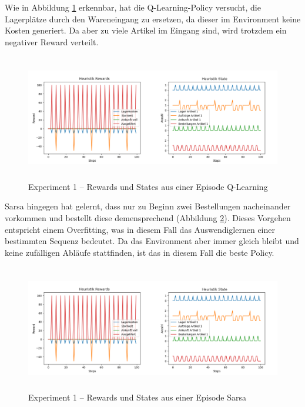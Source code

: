 \newpage
Wie in Abbildung \ref{fig:e1-pol-q} erkennbar, hat die Q-Learning-Policy versucht, die Lagerplätze durch den Wareneingang zu ersetzen, da dieser im Environment keine Kosten generiert. Da aber zu viele Artikel im Eingang sind, wird trotzdem ein negativer Reward verteilt. 

\begin{figure}[H]
  \centering
  \includegraphics[height=5.5cm]{img/plots/exp-1/heu-rew-state.png}
  \caption{Experiment 1 – Rewards und States aus einer Episode Q-Learning}
    \label{fig:e1-pol-q}
\end{figure}
Sarsa hingegen hat gelernt, dass nur zu Beginn zwei Bestellungen nacheinander vorkommen und bestellt diese demensprechend (Abbildung \ref{fig:e1-pol-sarsa}). Dieses Vorgehen entspricht einem Overfitting, was in diesem Fall das Auswendiglernen einer bestimmten Sequenz bedeutet. Da das Environment aber immer gleich bleibt und keine zufälligen Abläufe stattfinden, ist das in diesem Fall die beste Policy.
\begin{figure}[H]
  \centering
  \includegraphics[height=5.5cm]{img/plots/exp-1/heu-rew-state.png}
  \caption{Experiment 1 – Rewards und States aus einer Episode Sarsa}
    \label{fig:e1-pol-sarsa}
\end{figure}
